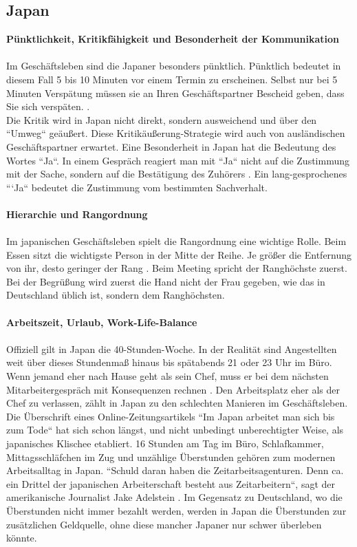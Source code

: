 	\subsection{Japan}
	\textbf{Pünktlichkeit, Kritikfähigkeit und Besonderheit der Kommunikation}\\
	\\
	Im Geschäftsleben sind die Japaner besonders pünktlich. Pünktlich bedeutet in diesem Fall 5 bis 10 Minuten vor einem Termin zu erscheinen. Selbst nur bei 5 Minuten Verspätung müssen sie an Ihren Geschäftspartner Bescheid geben, dass Sie sich verspäten. \cite{JPKnigge}. \\
	Die Kritik wird in Japan nicht direkt, sondern ausweichend und über den ``Umweg`` geäußert. Diese Kritikäußerung-Strategie wird auch von ausländischen Geschäftspartner erwartet. Eine Besonderheit in Japan hat die Bedeutung des Wortes ``Ja``. In einem Gespräch reagiert man mit ``Ja`` nicht auf die Zustimmung mit der Sache, sondern auf die Bestätigung des Zuhörers \cite{JPKnigge}. Ein lang-gesprochenes ```Ja`` bedeutet die Zustimmung vom bestimmten Sachverhalt.\\
	\\
	\textbf{Hierarchie und Rangordnung}\\
	\\
	Im japanischen Geschäftsleben spielt die Rangordnung eine wichtige Rolle.
	Beim Essen sitzt die wichtigste Person in der Mitte der Reihe. Je größer die Entfernung von ihr, desto geringer der Rang \cite{Business-KniggeFernost}.	
	Beim Meeting spricht der Ranghöchste zuerst. Bei der Begrüßung wird zuerst die Hand nicht der Frau gegeben, wie das in Deutschland üblich ist, sondern dem Ranghöchsten. \\
	\\
	\textbf{Arbeitszeit, Urlaub, Work-Life-Balance}\\
	\\
	Offiziell gilt in Japan die 40-Stunden-Woche. In der Realität sind Angestellten weit über dieses Stundenmaß hinaus bis spätabends 21 oder 23 Uhr im Büro. Wenn jemand eher nach Hause geht als sein Chef, muss er bei dem nächsten Mitarbeitergespräch mit Konsequenzen rechnen \cite{ArbZeitJP}. Den Arbeitsplatz eher als der Chef zu verlassen, zählt in Japan zu den schlechten Manieren im Geschäftsleben.
	Die Überschrift eines Online-Zeitungsartikels ``Im Japan arbeitet man sich bis zum Tode`` hat sich schon längst, und nicht unbedingt unberechtigter Weise, als japanisches Klischee etabliert. 
	16 Stunden am Tag im Büro, Schlafkammer, Mittagsschläfchen im Zug und unzählige Überstunden gehören zum modernen Arbeitsalltag in Japan. ``Schuld daran haben die Zeitarbeitsagenturen. Denn ca. ein Drittel der japanischen Arbeiterschaft besteht aus Zeitarbeitern``, sagt der amerikanische Journalist Jake Adelstein \cite{JPArbeit}. Im Gegensatz zu Deutschland, wo die Überstunden nicht immer bezahlt werden, werden in Japan die Überstunden zur zusätzlichen Geldquelle, ohne diese mancher Japaner nur schwer überleben könnte.
